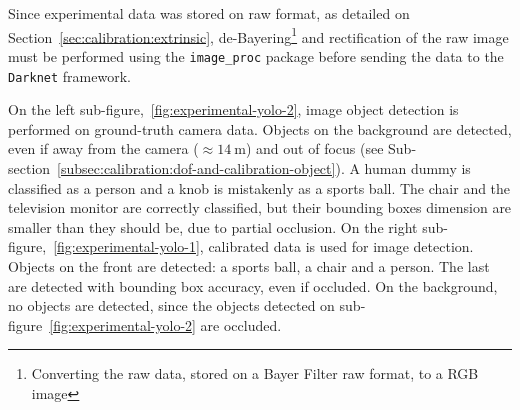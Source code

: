 Since experimental data was stored on raw format, as detailed on Section~\ref{sec:calibration:extrinsic}, de-Bayering\footnote{Converting the raw data, stored on a Bayer Filter raw format, to  a RGB image} and rectification of the raw image must be performed using the \texttt{image\_proc} package before sending the data to the \texttt{Darknet} framework.

On the left sub-figure,~\ref{fig:experimental-yolo-2}, image object detection is performed on ground-truth camera data. Objects on the background are detected, even if away from the camera ($\approx\SI{14}{\meter}$) and out of focus (see Sub-section~\ref{subsec:calibration:dof-and-calibration-object}). A human dummy is classified as a person and a knob is mistakenly as a sports ball. The chair and the television monitor are correctly classified, but their bounding boxes dimension are smaller than they should be, due to partial occlusion.
On the right sub-figure,~\ref{fig:experimental-yolo-1}, calibrated data is used for image detection. Objects on the front are detected: a sports ball, a chair and a person. The last are detected with bounding box accuracy, even if occluded. On the background, no objects are detected, since the objects detected on sub-figure~\ref{fig:experimental-yolo-2} are occluded. 

